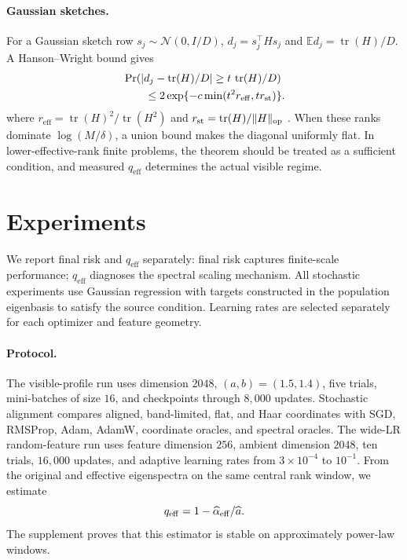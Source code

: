 \documentclass[letterpaper]{article} %
\newcommand{\E}{\mathbb{E}}
\newcommand{\tr}{\operatorname{tr}}
\newcommand{\qeff}{q_{\mathrm{eff}}}
\newcommand{\reff}{r_{\mathrm{eff}}}
\begin{document}
\paragraph{Gaussian sketches.}
For a Gaussian sketch row $s_j\sim\mathcal N(0,I/D)$,
$d_j=s_j^\top Hs_j$ and $\E d_j=\tr(H)/D$.  A Hanson--Wright bound gives
\[
\begin{aligned}
 &\Pr\!\left(
 |d_j-\tr(H)/D|\ge t\,\tr(H)/D
 \right)\\
 &\qquad\le
 2\exp\{-c\min(t^2\reff,t r_{\rm st})\}.
\end{aligned}
\]
where
$\reff=\tr(H)^2/\tr(H^2)$ and
$r_{\rm st}=\tr(H)/\|H\|_{\rm op}$ \cite{rudelson2013hanson}.
When these ranks dominate $\log(M/\delta)$, a union bound makes the diagonal uniformly flat.  In lower-effective-rank finite problems, the theorem should be treated as a sufficient condition, and measured $\qeff$ determines the actual visible regime.

\section{Experiments}

We report final risk and $\qeff$ separately: final risk captures finite-scale performance; $\qeff$ diagnoses the spectral scaling mechanism.  All stochastic experiments use Gaussian regression with targets constructed in the population eigenbasis to satisfy the source condition.  Learning rates are selected separately for each optimizer and feature geometry.

\paragraph{Protocol.}
The visible-profile run uses dimension $2048$, $(a,b)=(1.5,1.4)$, five trials, mini-batches of size $16$, and checkpoints through $8{,}000$ updates.  Stochastic alignment compares aligned, band-limited, flat, and Haar coordinates with SGD, RMSProp, Adam, AdamW, coordinate oracles, and spectral oracles.  The wide-LR random-feature run uses feature dimension $256$, ambient dimension $2048$, ten trials, $16{,}000$ updates, and adaptive learning rates from $3\times10^{-4}$ to $10^{-1}$.  From the original and effective eigenspectra on the same central rank window, we estimate
\[
 \qeff=1-\widehat\alpha_{\rm eff}/\widehat a.
\]
The supplement proves that this estimator is stable on approximately power-law windows.
\end{document}
